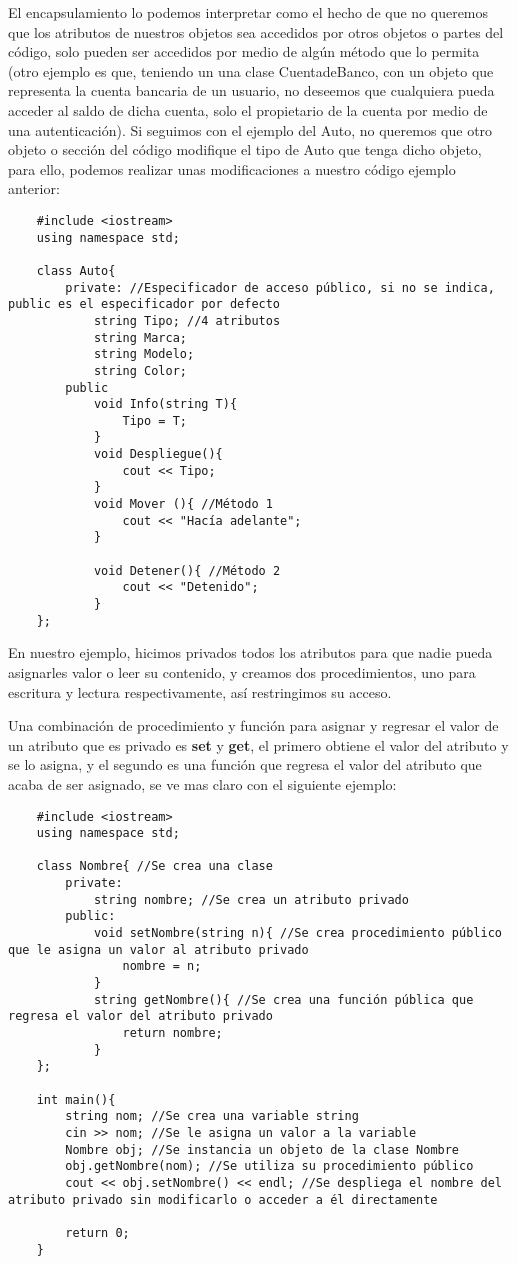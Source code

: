 El encapsulamiento lo podemos interpretar como el hecho de que no queremos que los atributos de nuestros objetos sea accedidos por otros objetos o partes del código, solo pueden ser accedidos por medio de algún método que lo permita (otro ejemplo es que, teniendo un una clase CuentadeBanco, con un objeto que representa la cuenta bancaria de un usuario, no deseemos que cualquiera pueda acceder al saldo de dicha cuenta, solo el propietario de la cuenta por medio de una autenticación). Si seguimos con el ejemplo del Auto, no queremos que otro objeto o sección del código modifique el tipo de Auto que tenga dicho objeto, para ello, podemos realizar unas modificaciones a nuestro código ejemplo anterior:
\begin{lstlisting}
    #include <iostream>
    using namespace std;
    
    class Auto{
        private: //Especificador de acceso público, si no se indica, public es el especificador por defecto
            string Tipo; //4 atributos
            string Marca;
            string Modelo;
            string Color;
        public
            void Info(string T){
                Tipo = T;
            }
            void Despliegue(){
                cout << Tipo;
            }
            void Mover (){ //Método 1
                cout << "Hacía adelante";
            }
            
            void Detener(){ //Método 2
                cout << "Detenido";
            }
    };
\end{lstlisting}

En nuestro ejemplo, hicimos privados todos los atributos para que nadie pueda asignarles valor o leer su contenido, y creamos dos procedimientos, uno para escritura y lectura respectivamente, así restringimos su acceso.

Una combinación de procedimiento y función para asignar y regresar el valor de un atributo que es privado es \textbf{set} y \textbf{get}, el primero obtiene el valor del atributo y se lo asigna, y el segundo es una función que regresa el valor del atributo que acaba de ser asignado, se ve mas claro con el siguiente ejemplo:
\begin{lstlisting}
    #include <iostream>
    using namespace std;

    class Nombre{ //Se crea una clase
        private:
            string nombre; //Se crea un atributo privado
        public:
            void setNombre(string n){ //Se crea procedimiento público que le asigna un valor al atributo privado
                nombre = n;
            }
            string getNombre(){ //Se crea una función pública que regresa el valor del atributo privado
                return nombre;
            }
    };
    
    int main(){
        string nom; //Se crea una variable string
        cin >> nom; //Se le asigna un valor a la variable
        Nombre obj; //Se instancia un objeto de la clase Nombre
        obj.getNombre(nom); //Se utiliza su procedimiento público
        cout << obj.setNombre() << endl; //Se despliega el nombre del atributo privado sin modificarlo o acceder a él directamente
        
        return 0;
    }
\end{lstlisting}


